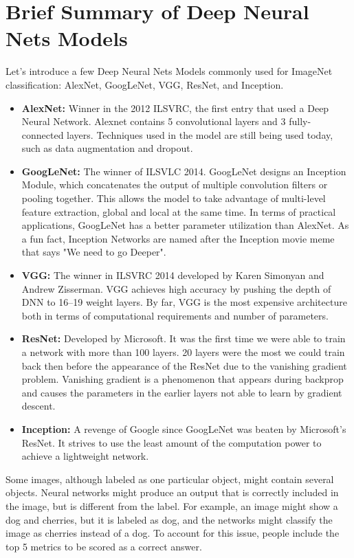 \section{Brief Summary of Deep Neural Nets Models}
Let's introduce a few Deep Neural Nets Models commonly used for ImageNet classification: AlexNet, GoogLeNet, VGG, ResNet, and Inception.
\begin{itemize}
    \item \textbf{AlexNet:}  Winner in the 2012 ILSVRC, the first entry that used a Deep Neural Network. Alexnet contains 5 convolutional layers and 3 fully-connected layers. Techniques used in the model are still being used today, such as data augmentation and dropout.
    \item \textbf{GoogLeNet:} The winner of ILSVLC 2014. GoogLeNet designs an Inception Module, which concatenates the output of multiple convolution filters or pooling together.  This allows the model to take advantage of multi-level feature extraction, global and local at the same time. In terms of practical applications, GoogLeNet has a better parameter utilization than AlexNet. As a fun fact, Inception Networks are named after the Inception movie meme that says "We need to go Deeper".
    \item \textbf{VGG:}  The winner in ILSVRC 2014 developed by Karen Simonyan and Andrew Zisserman. VGG achieves high accuracy by pushing the depth of DNN to 16--19 weight layers. By far, VGG is the most expensive architecture both in terms of computational requirements and number of parameters.
    \item \textbf{ResNet:} Developed by Microsoft. It was the first time we were able to train a network with more than 100 layers. 20 layers were the most we could train back then before the appearance of the ResNet due to the vanishing gradient problem. Vanishing gradient is a phenomenon that appears during backprop and causes the parameters in the earlier layers not able to learn by gradient descent.
    \item \textbf{Inception:} A revenge of Google since GoogLeNet was beaten by Microsoft's ResNet. It strives to use the least amount of the computation power to achieve a lightweight network.
\end{itemize}

Some images, although labeled as one particular object, might contain several objects. Neural networks might produce an output that is correctly included in the image, but is different from the label. For example, an image might show a dog and cherries, but it is labeled as dog, and the networks might classify the image as cherries instead of a dog. To account for this issue, people include the top 5 metrics to be scored as a correct answer.

